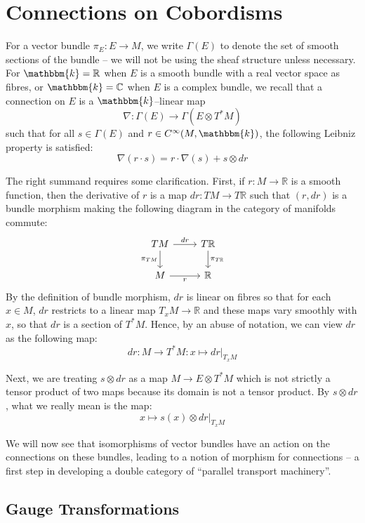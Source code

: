 \documentclass{amsart}
\newcommand{\R}{\mathbb{R}}
\newcommand{\C}{\mathbb{C}}
\newcommand{\K}{\mathbbm{k}}
\newcommand{\tensor}{\otimes}
\renewcommand{\to}[1][]{\stackrel{#1}{\longrightarrow}}
\renewcommand{\mapsto}{\longmapsto}
\newcommand{\Cinf}{C^{\infty}}
\numberwithin{thm}{section}
\theoremstyle{definition}
\begin{document}
%

\section{Connections on Cobordisms}

For a vector bundle $\pi_E : E \to M$, we write $\Gamma(E)$ to denote the set of
smooth sections of the bundle -- we will not be using the sheaf structure unless
necessary. For $\K = \R$ when $E$ is a smooth bundle with a real vector space as
fibres, or $\K = \C$ when $E$ is a complex bundle, we recall that a connection
on $E$ is a $\K$--linear map
\[
  \nabla : \Gamma(E) \to \Gamma(E \tensor T^*M)
\]
such that for all $s \in \Gamma(E)$ and $r \in \Cinf(M, \K)$, the following
Leibniz property is satisfied:
\[
  \nabla(r \cdot s) = r \cdot \nabla(s) + s \tensor dr
\]

The right summand requires some clarification.
First, if $r : M \to \R$ is a smooth function, then the derivative of $r$ is a
map $dr : TM \to T\R$ such that $(r, dr)$ is a bundle morphism making the
following diagram in the category of manifolds commute:
\[\begin{tikzcd}
TM \ar[d, "\pi_{TM}" left] \ar[r, "dr" above] & T\R \ar[d, "\pi_{T\R}" right]\\
M \ar[r, "r" below] & \R
\end{tikzcd}\]
By the definition of bundle morphism, $dr$ is linear on fibres so that for each
$x \in M$, $dr$ restricts to a linear map $T_xM \to \R$ and these maps vary
smoothly with $x$, so that $dr$ is a section of $T^*M$. Hence, by an abuse of
notation, we can view $dr$ as the following map:
\[
  dr : M \to T^*M : x \mapsto dr|_{T_xM}
\]

Next, we are treating $s \tensor dr$ as a map $M \to E \tensor T^*M$ which is
not strictly a tensor product of two maps because its domain is not a tensor
product. By $s \tensor dr$, what we really mean is the map:
\begin{equation}\label{eqn:conn_tensor}
  x \mapsto s(x) \tensor dr|_{T_xM}
\end{equation}

We will now see that isomorphisms of vector bundles have an action on the
connections on these bundles, leading to a notion of morphism for connections --
a first step in developing a double category of
``parallel transport machinery''.

% 

\subsection{Gauge Transformations}
\end{document}
